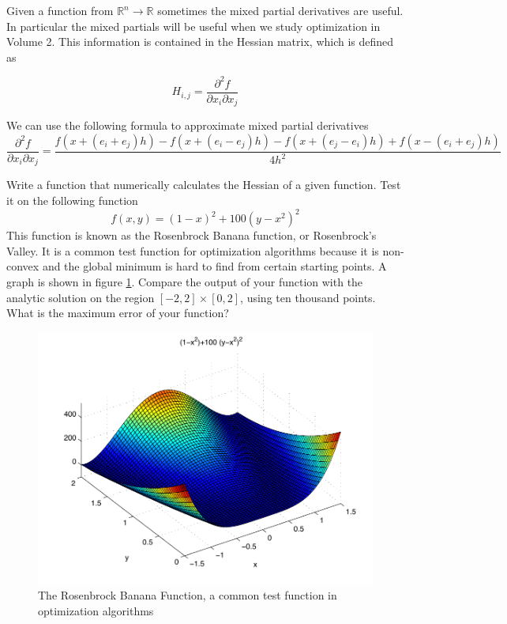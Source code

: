 Given a function from $\mathbb{R}^n \to \mathbb{R}$ sometimes the mixed partial derivatives are useful. In particular the mixed partials will be useful when we study optimization in Volume 2. This information is contained in the Hessian matrix, which is defined as

\begin{equation*}
H_{i,j} = \frac{\partial^2 f}{\partial x_i \partial x_j}
\end{equation*}

We can use the following formula to approximate mixed partial derivatives
\small
\begin{equation*}
\frac{\partial^2 f}{\partial x_i \partial x_j} = \frac{f(x + (e_i + e_j)h) - f(x + (e_i-e_j)h) -f(x + (e_j-e_i)h) + f(x - (e_i + e_j)h)}{4h^2}
\end{equation*}
\normalsize

\begin{problem}
Write a \ProgrammingLanguage function that numerically calculates the Hessian of a given function. Test it on the following function
\begin{equation*}
f(x,y) = (1-x)^2 + 100(y-x^2)^2
\end{equation*}
This function is known as the Rosenbrock Banana function, or Rosenbrock's Valley. It is a common test function for optimization algorithms because it is non-convex and the global minimum is hard to find from certain starting points. A graph is shown in figure \ref{Fig:Rosenbrock}. Compare the output of your function with the analytic solution on the region $[-2,2] \times [0,2]$, using ten thousand points. What is the maximum error of your function?
\end{problem}
\begin{figure}
\begin{center}
\includegraphics[scale = .8]{Rosenbrock}
\caption{The Rosenbrock Banana Function, a common test function in optimization algorithms}
\label{Fig:Rosenbrock}
\end{center}
\end{figure}